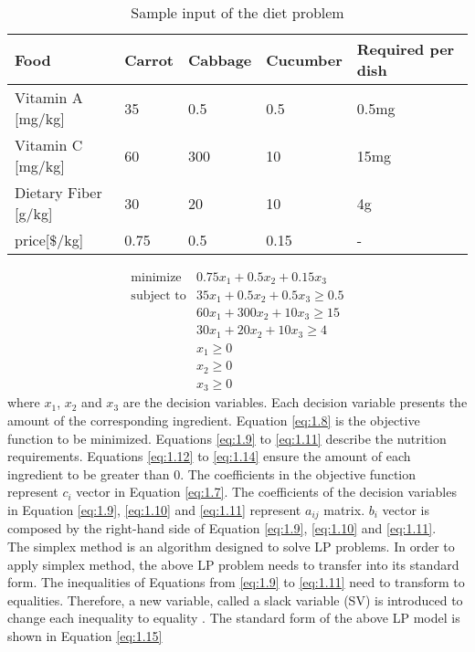 \begin{table} 
\begin{center}
\begin{tabular}{| l | l  l  l | l |}
\hline
Food & Carrot & Cabbage & Cucumber & Required per dish \\ \hline
Vitamin A [mg/kg] & 35 & 0.5 & 0.5 & 0.5mg \\ 
Vitamin C [mg/kg] & 60 & 300 & 10 & 15mg \\ 
Dietary Fiber [g/kg] & 30 & 20 & 10 & 4g \\ \hline
price[$\$$/kg] & 0.75 & 0.5 & 0.15 & - \\ \hline
\end{tabular} 
\end{center}
\caption{Sample input of the diet problem}
\label{tab:1.1}
\end{table}	

\begin{eqnarray} 
\text{minimize} & 0.75x_{1} + 0.5x_{2} +  0.15x_{3}  \label{eq:1.8} \\
\text{subject to} & 35x_{1} + 0.5x_{2} + 0.5x_{3} \geq 0.5 \label{eq:1.9} \\
& 60x_{1} + 300x_{2} + 10x_{3} \geq 15 \label{eq:1.10} \\
& 30x_{1} + 20x_{2} + 10x_{3} \geq 4 \label{eq:1.11} \\
& x_{1} \geq 0  \label{eq:1.12} \\
& x_{2} \geq 0  \label{eq:1.13} \\
& x_{3} \geq 0  \label{eq:1.14}
\end{eqnarray} 
where $x_{1}$, $x_{2}$ and $x_{3}$ are the decision variables. Each decision variable presents the amount of the corresponding ingredient. Equation \ref{eq:1.8} is the objective function to be minimized. Equations \ref{eq:1.9} to  \ref{eq:1.11} describe the nutrition requirements. Equations \ref{eq:1.12} to \ref{eq:1.14} ensure the amount of each ingredient to be greater than 0. The coefficients in the objective function represent $c_{i}$ vector in Equation \ref{eq:1.7}. The coefficients of the decision variables in Equation \ref{eq:1.9}, \ref{eq:1.10} and \ref{eq:1.11} represent $a_{ij}$ matrix. $b_{i}$ vector is composed by the right-hand side of Equation \ref{eq:1.9}, \ref{eq:1.10} and \ref{eq:1.11}. \\

The simplex method is an algorithm designed to solve LP problems. In order to apply simplex method, the above LP problem needs to transfer into its standard form. The inequalities of Equations from \ref{eq:1.9} to \ref{eq:1.11} need to transform to equalities. Therefore, a new variable, called a slack variable (SV) is introduced to change each inequality to equality \cite{ConvexOptimization}. The standard form of the above LP model is shown in Equation \ref{eq:1.15} \\

